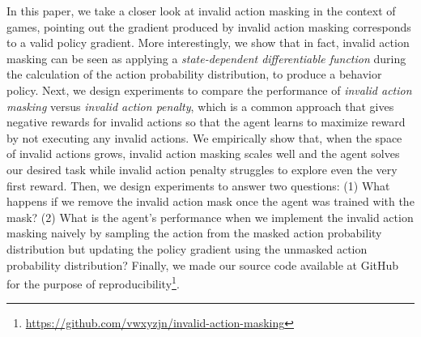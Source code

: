 \documentclass[letterpaper]{article}
\begin{document}
In this paper, we take a closer look at invalid action masking in the context of games, pointing out the gradient produced by invalid action masking corresponds to a valid policy gradient. More interestingly, we show that in fact, invalid action masking can be seen as applying a \emph{state-dependent differentiable function} during the calculation of the action probability distribution, to produce a behavior policy. %
Next, we design experiments to compare the performance of {\em invalid action masking} versus {\em invalid action penalty}, which is a common approach that gives negative rewards for invalid actions so that the agent learns to maximize reward by not executing any invalid actions. We empirically show that, when the space of invalid actions grows, invalid action masking scales well and the agent solves our desired task while invalid action penalty struggles to explore even the very first reward. Then, we design experiments to answer two questions: (1) What happens if we remove the invalid action mask once the agent was trained with the mask?
(2) What is the agent's performance when we implement the invalid action masking naively by sampling the action from the masked action probability distribution but updating the policy gradient using the unmasked action probability distribution? Finally, we made our source code available at GitHub for the purpose of reproducibility\footnote{\footnotesize \url{https://github.com/vwxyzjn/invalid-action-masking}}.
\end{document}
